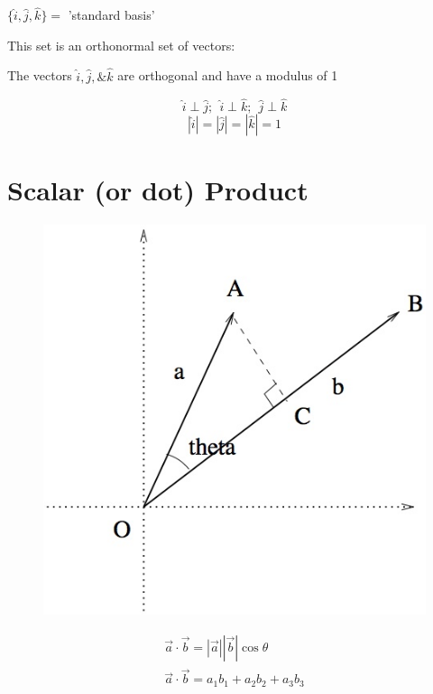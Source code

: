 \documentclass[a4paper, 11pt, normalem]{report}
\begin{document}
$\{\hat{i}, \hat{j}, \hat{k}\} = $ 'standard basis'

This set is an orthonormal set of vectors:

The vectors $\hat{i}, \hat{j}, \& \hat{k}$ are orthogonal and have a modulus of 1

\begin{equation*}
    \hat{i} \perp \hat{j};~~ \hat{i} \perp \hat{k};~~ \hat{j} \perp \hat{k}
\end{equation*}
\begin{equation*}
    |\hat{i}| = |\hat{j}| = |\hat{k}| =  1
\end{equation*}

\section{Scalar (or dot) Product}
\begin{figure}
    \begin{center}
        \includegraphics[scale=0.5]{Scalar.jpg}
    \end{center}
\end{figure}
\begin{gather*}
    \vec{a} \cdot \vec{b} = |\vec{a}||\vec{b}|\cos\theta \\
    \vec{a} \cdot \vec{b} = a_{1}b_{1} + a_{2}b_{2} + a_{3}b_{3}
\end{gather*}
\end{document}
